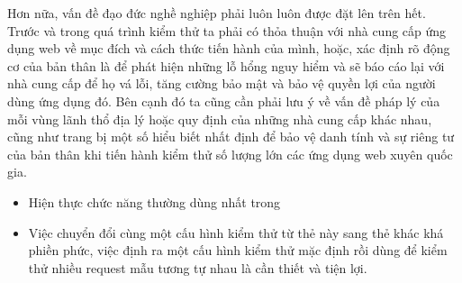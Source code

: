 Hơn nữa, vấn đề đạo đức nghề nghiệp phải luôn luôn được đặt lên trên hết. Trước và trong quá trình kiểm thử ta phải có thỏa thuận với nhà cung cấp ứng dụng web về mục đích và cách thức tiến hành của mình, hoặc, xác định rõ động cơ của bản thân là để phát hiện những lỗ hổng nguy hiểm và sẽ báo cáo lại với nhà cung cấp để họ vá lỗi, tăng cường bảo mật và bảo vệ quyền lợi của người dùng ứng dụng đó. Bên cạnh đó ta cũng cần phải lưu ý về vấn đề pháp lý của mỗi vùng lãnh thổ địa lý hoặc quy định của những nhà cung cấp khác nhau, cũng như trang bị một số hiểu biết nhất định để bảo vệ danh tính và sự riêng tư của bản thân khi tiến hành kiểm thử số lượng lớn các ứng dụng web xuyên quốc gia.\par

\begin{itemize}
    \item Hiện thực chức năng thường dùng nhất trong 
    \item Việc chuyển đổi cùng một cấu hình kiểm thử từ thẻ này sang thẻ khác khá phiền phức, việc định ra một cấu hình kiểm thử mặc định rồi dùng để kiểm thử nhiều request mẫu tương tự nhau là cần thiết và tiện lợi.
\end{itemize}


